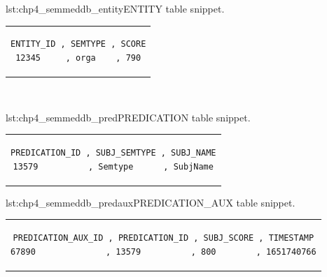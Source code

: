 \noindent\begin{minipage}{0.42\linewidth}
\begin{captionedlisting}{lst:chp4_semmeddb_entity}{ENTITY table snippet.}
\centering
\begin{tabular}{c}
\hspace{-0.7em}
{
\begin{lstlisting}[basicstyle=\ttfamily\small,label={lst:chp6-1_semmeddb_entity},columns=flexible]
ENTITY_ID , SEMTYPE , SCORE
12345     , orga    , 790
\end{lstlisting}
}
\end{tabular}
\end{captionedlisting}
\end{minipage}
\,\,\,\,\hfill
\begin{minipage}{0.58\linewidth}
\begin{captionedlisting}{lst:chp4_semmeddb_pred}{PREDICATION table snippet.}
\centering
\begin{tabular}{c}
\hspace{-1em}
{
\begin{lstlisting}[basicstyle=\ttfamily\small,label={lst:chp6-1_semmeddb_pred},columns=flexible]
PREDICATION_ID , SUBJ_SEMTYPE , SUBJ_NAME
13579          , Semtype      , SubjName
\end{lstlisting}
}
\end{tabular}
\end{captionedlisting}
\end{minipage}


\noindent\hspace{0.23\linewidth}\begin{minipage}{\linewidth}
\begin{captionedlisting}{lst:chp4_semmeddb_predaux}{PREDICATION\_AUX table snippet.}
\centering
\begin{tabular}{c}
\hspace{-5em}
{
\begin{lstlisting}[basicstyle=\ttfamily\small,label={lst:chp6-1_semmeddb_predaux},columns=flexible]
PREDICATION_AUX_ID , PREDICATION_ID , SUBJ_SCORE , TIMESTAMP
67890              , 13579          , 800        , 1651740766
\end{lstlisting}
}
\end{tabular}
\end{captionedlisting}
\end{minipage}


